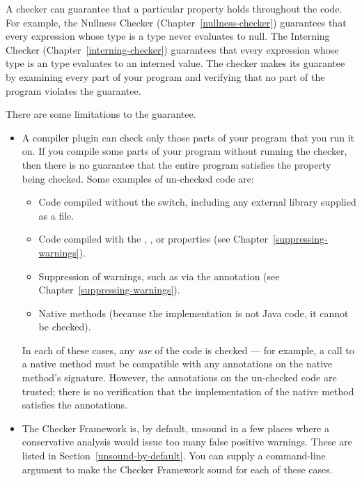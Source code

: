 A checker can guarantee that a particular property holds throughout the
code.  For example, the Nullness Checker (Chapter~\ref{nullness-checker})
guarantees that every expression whose type is a  type never
evaluates to null.  The Interning Checker (Chapter~\ref{interning-checker})
guarantees that every expression whose type is an  type
evaluates to an interned value.  The checker makes its guarantee by
examining every part of your program and verifying that no part of the
program violates the guarantee.

There are some limitations to the guarantee.


\begin{itemize}

\item
  A compiler plugin can check only those parts of your program that you run
  it on.  If you compile some parts of your program without running the
  checker, then there is no guarantee that the entire program satisfies the
  property being checked.  Some examples of un-checked code are:

  \begin{itemize}
  \item
    Code compiled without the  switch, including any
    external library supplied as a  file.
  \item
    Code compiled with the , ,  or 
    properties (see Chapter~\ref{suppressing-warnings}).
  \item
    Suppression of warnings, such as via the 
    annotation (see Chapter~\ref{suppressing-warnings}).
  \item
    Native methods (because the implementation is not Java code, it cannot
    be checked).
  \end{itemize}

  In each of these cases, any \emph{use} of the code is checked --- for
  example, a call to a native method must be compatible with any
  annotations on the native method's signature.
  However, the annotations on the un-checked code are trusted; there is no
  verification that the implementation of the native method satisfies the
  annotations.

\item
  The Checker Framework is, by default, unsound in a few places where a
  conservative analysis would issue too many false positive warnings.
  These are listed in Section~\ref{unsound-by-default}.
  You can supply a command-line argument to make the Checker Framework
  sound for each of these cases.


\end{itemize}
